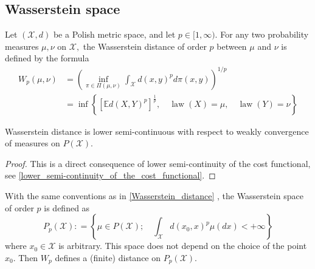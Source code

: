 \subsection{Wasserstein space}

\begin{defn}
	\label{Wasserstein_distance}
	Let  \(( \mathcal { X } , d ) \) be a Polish metric space, and let \( p \in [ 1 , \infty ) . \) For any two probability measures \( \mu , \nu \) on \( \mathcal { X } , \) the Wasserstein distance of order \( p \) between \( \mu \) and \( \nu \) is defined by the formula
	\begin{align*}
		W _ { p } ( \mu , \nu ) & = \left( \inf _ { \pi \in \Pi ( \mu , \nu ) } \int _ { \mathcal { X } } d ( x , y ) ^ { p } d \pi ( x , y ) \right) ^ { 1 / p }                                                      \\
		                        & = \inf \left\{ \left[ \mathbb { E } d ( X , Y ) ^ { p } \right] ^ { \frac { 1 } { p } } , \quad \operatorname { law } ( X ) = \mu , \quad \operatorname { law } ( Y ) = \nu \right\}
	\end{align*}
\end{defn}

\begin{lem}
	\label{lower_semicontinous_Wasserstein_distance}
	Wasserstein distance is lower semi-continuous with respect to weakly convergence of measures on $P(\mathscr{X})$.
\end{lem}

\begin{proof}
	This is a direct consequence of lower semi-continuity of the cost functional, see \cref{lower_semi-continuity_of_the_cost_functional}.
\end{proof}

\begin{defn}
	\label{Wasserstein_space}
	With the same conventions as in \cref{Wasserstein_distance} , the Wasserstein space of order \( p \) is defined as
	\[
		P _ { p } ( \mathcal { X } ): = \left\{ \mu \in P ( \mathcal { X } ) ; \quad \int _ { \mathcal { X } } d \left( x _ { 0 } , x \right) ^ { p } \mu ( d x ) < + \infty \right\}
	\]
	where \( x _ { 0 } \in \mathcal { X } \) is arbitrary. This space does not depend on the choice of the point \( x _ { 0 } \). Then \( W _ { p } \) defines a (finite) distance on \( P _ { p } ( \mathcal { X } ) \).
\end{defn}

